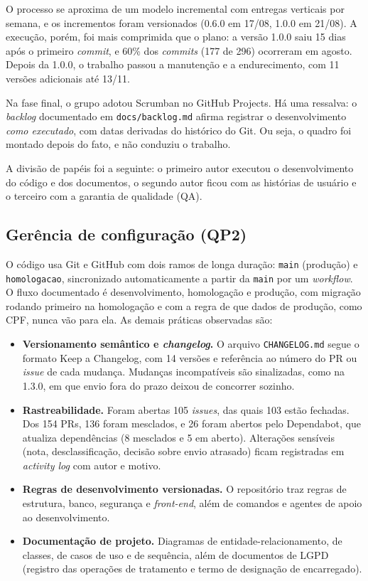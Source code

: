 O processo se aproxima de um modelo incremental com entregas verticais por semana, e os incrementos foram versionados (0.6.0 em 17/08, 1.0.0 em 21/08). A execução, porém, foi mais comprimida que o plano: a versão 1.0.0 saiu 15 dias após o primeiro \textit{commit}, e 60\% dos \textit{commits} (177 de 296) ocorreram em agosto. Depois da 1.0.0, o trabalho passou a manutenção e a endurecimento, com 11 versões adicionais até 13/11.

Na fase final, o grupo adotou Scrumban \cite{ladas2009} no GitHub Projects. Há uma ressalva: o \textit{backlog} documentado em \texttt{docs/backlog.md} afirma registrar o desenvolvimento \textit{como executado}, com datas derivadas do histórico do Git. Ou seja, o quadro foi montado depois do fato, e não conduziu o trabalho.

A divisão de papéis foi a seguinte: o primeiro autor executou o desenvolvimento do código e dos documentos, o segundo autor ficou com as histórias de usuário e o terceiro com a garantia de qualidade (QA).

\subsection{Gerência de configuração (QP2)}

O código usa Git e GitHub com dois ramos de longa duração: \texttt{main} (produção) e \texttt{homologacao}, sincronizado automaticamente a partir da \texttt{main} por um \textit{workflow}. O fluxo documentado é desenvolvimento, homologação e produção, com migração rodando primeiro na homologação e com a regra de que dados de produção, como CPF, nunca vão para ela. As demais práticas observadas são:

\begin{itemize}
  \item \textbf{Versionamento semântico e \textit{changelog}.} O arquivo \texttt{CHANGELOG.md} segue o formato Keep a Changelog, com 14 versões e referência ao número do PR ou \textit{issue} de cada mudança. Mudanças incompatíveis são sinalizadas, como na 1.3.0, em que envio fora do prazo deixou de concorrer sozinho.
  \item \textbf{Rastreabilidade.} Foram abertas 105 \textit{issues}, das quais 103 estão fechadas. Dos 154 PRs, 136 foram mesclados, e 26 foram abertos pelo Dependabot, que atualiza dependências (8 mesclados e 5 em aberto). Alterações sensíveis (nota, desclassificação, decisão sobre envio atrasado) ficam registradas em \textit{activity log} com autor e motivo.
  \item \textbf{Regras de desenvolvimento versionadas.} O repositório traz regras de estrutura, banco, segurança e \textit{front-end}, além de comandos e agentes de apoio ao desenvolvimento.
  \item \textbf{Documentação de projeto.} Diagramas de entidade-relacionamento, de classes, de casos de uso e de sequência, além de documentos de LGPD (registro das operações de tratamento e termo de designação de encarregado).
\end{itemize}

